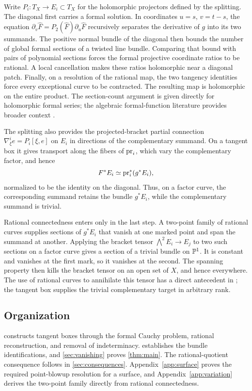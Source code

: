 Write \(P_i:T_X\to E_i\subset T_X\) for the holomorphic projectors
defined by the splitting. The diagonal first carries a formal solution. In coordinates
\(u=s\), \(v=t-s\), the equation
\(\partial_v\widehat F=P_2(\widehat F)\partial_u\widehat F\)
recursively separates the derivative of \(g\) into its two summands.
The positive normal bundle of the diagonal then bounds the number of
global formal sections of a twisted line bundle. Comparing that bound
with pairs of polynomial sections forces the formal projective
coordinate ratios to be rational. A local cancellation makes these
ratios holomorphic near a diagonal patch. Finally, on a resolution of
the rational map, the two tangency identities force every exceptional
curve to be contracted. The resulting map is holomorphic on the entire
product. The section-count argument is given directly for holomorphic
formal series; the algebraic formal-function literature provides
broader context \cite{HM68,Bad96}.

The splitting also provides the projected-bracket partial connection
\(\nabla^i_\xi e=P_i[\xi,e]\) on \(E_i\) in directions of the
complementary summand. On a tangent box it gives transport along the
fibers of \(\operatorname{pr}_i\), which vary the complementary factor, and hence
\[
F^*E_i\simeq\operatorname{pr}_i^*(g^*E_i),
\]
normalized to be the identity on the diagonal. Thus, on a factor curve,
the corresponding summand retains the bundle \(g^*E_i\), while the
complementary summand is trivial.

Rational connectedness enters only in the last step. A two-point family
of rational curves supplies sections of \(g^*E_i\) that vanish at one
marked point and span the summand at another. Applying the bracket tensor
\(\bigwedge^2E_i\to E_j\) to two such sections on a factor curve gives
a section of a trivial bundle on \(\mathbb P^1\). It is constant and vanishes
at the first mark, so it vanishes at the second. The spanning property
then kills the bracket tensor on an open set of \(X\), and hence
everywhere. The use of rational curves to annihilate this tensor has a
direct antecedent in \cite[Section~2.B and Lemma~3.18]{Hor07}; the tangent
box supplies the trivial complementary target in arbitrary rank.

\subsection*{Organization}

 constructs tangent boxes through the formal Cauchy
problem, rational reconstruction, and removal of indeterminacy.
 establishes the bundle identifications, and
\cref{sec:vanishing} proves \cref{thm:main}. The rational-quotient
consequence follows in \cref{sec:consequences}. Appendix~\ref{app:surface}
proves the required point-blowup resolution for a surface, and
Appendix~\ref{app:variation} derives the two-point family directly from
rational connectedness.
